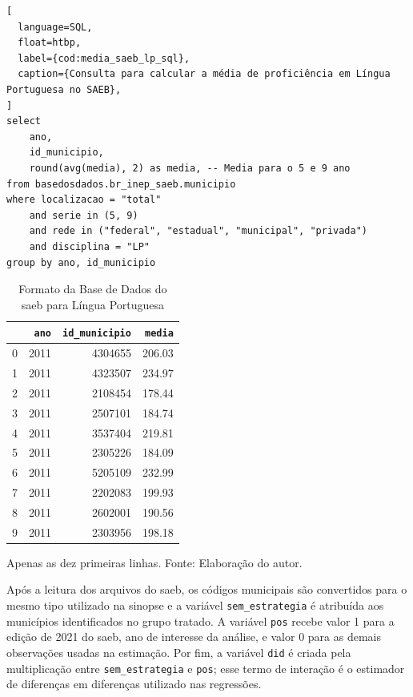 \documentclass[
	12pt,				%
	openright,			%
	oneside,			%
	a4paper,			%
	brazil,				%
	]{article}
\begin{document}
\begin{lstlisting}[
  language=SQL,
  float=htbp,
  label={cod:media_saeb_lp_sql},
  caption={Consulta para calcular a média de proficiência em Língua Portuguesa no SAEB},
]
select
    ano,
    id_municipio,
    round(avg(media), 2) as media, -- Media para o 5 e 9 ano
from basedosdados.br_inep_saeb.municipio
where localizacao = "total"
    and serie in (5, 9)
    and rede in ("federal", "estadual", "municipal", "privada")
    and disciplina = "LP"
group by ano, id_municipio
\end{lstlisting}

\begin{table}[htbp]
\caption{Formato da Base de Dados do \acrshort{saeb} para Língua Portuguesa}\label{tab:saeb_data_format_lp}
\centering
\begin{tabular}{rrrr}
\toprule
 & \texttt{ano} & \texttt{id\_municipio} & \texttt{media} \\
\midrule
0 & 2011 & 4304655 & 206.03 \\
1 & 2011 & 4323507 & 234.97 \\
2 & 2011 & 2108454 & 178.44 \\
3 & 2011 & 2507101 & 184.74 \\
4 & 2011 & 3537404 & 219.81 \\
5 & 2011 & 2305226 & 184.09 \\
6 & 2011 & 5205109 & 232.99 \\
7 & 2011 & 2202083 & 199.93 \\
8 & 2011 & 2602001 & 190.56 \\
9 & 2011 & 2303956 & 198.18 \\
\bottomrule
\end{tabular}
\begin{tablenotes}
\footnotesize
\item Apenas as dez primeiras linhas. Fonte: Elaboração do autor.
\end{tablenotes}
\end{table}

Após a leitura dos arquivos do \acrshort{saeb}, os códigos municipais são
convertidos para o mesmo tipo utilizado na sinopse e a variável
\texttt{sem\_estrategia} é atribuída aos municípios identificados no grupo
tratado. A variável \texttt{pos} recebe valor 1 para a edição de 2021 do
\acrshort{saeb}, ano de interesse da análise, e valor 0 para as demais
observações usadas na estimação. Por fim, a variável \texttt{did} é criada pela
multiplicação entre \texttt{sem\_estrategia} e \texttt{pos}; esse termo de
interação é o estimador de diferenças em diferenças utilizado nas regressões.
\end{document}
